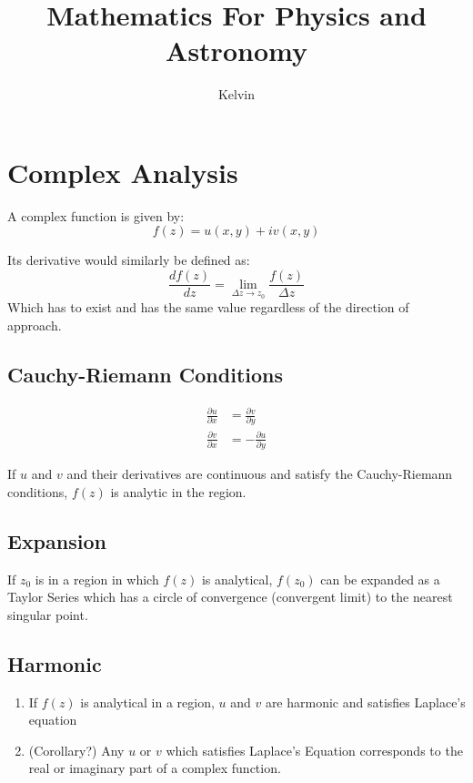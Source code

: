\documentclass[12pt]{article}
\title{Mathematics For Physics and Astronomy}
\author{Kelvin}
\begin{document}
\maketitle



\section{Complex Analysis}


A complex function is given by:
\[f(z) = u(x,y) + iv(x,y)\]

Its derivative would similarly be defined as:\[ \frac{df(z)}{dz} = \lim_{\Delta z\to z_0}\frac{f(z)}{\Delta z}\]
Which has to exist and has the same value regardless of the direction of approach.



\subsection{Cauchy-Riemann Conditions}
\begin{align*}
    \frac{\partial u}{\partial x} &= \frac{\partial v}{\partial y}\\
    \frac{\partial v}{\partial x} &= -\frac{\partial u}{\partial y}
\end{align*}

If $u$ and $v$ and their derivatives are continuous and satisfy the Cauchy-Riemann conditions, $f(z)$ is analytic in the region. 

\subsection{Expansion}
If $z_0$ is in a region in which $f(z)$ is analytical, $f(z_0)$ can be expanded as a Taylor Series which has a circle of convergence (convergent limit) to the nearest singular point.

\subsection{Harmonic}
\begin{enumerate}
    \item If $f(z)$ is analytical in a region, $u$ and $v$ are harmonic and satisfies Laplace's equation
    \item (Corollary?) Any $u$ or $v$ which satisfies Laplace's Equation corresponds to the real or imaginary part of a complex function. 
\end{enumerate}
\end{document}
